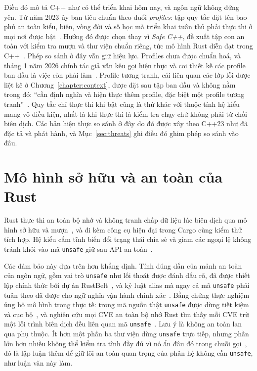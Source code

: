 Điều đó mô tả C++ như có thể triển khai hôm nay, và ngôn ngữ không đứng yên. Từ năm 2023 ủy
ban tiêu chuẩn theo đuổi \emph{profiles}: tập quy tắc đặt tên bao phủ an toàn kiểu, biên, vòng
đời và số học mà triển khai tuân thủ phải thực thi ở mọi nơi được
bật~\cite{sutter2025profiles}. Hướng đó được chọn thay vì \emph{Safe C++}, đề xuất tập con an
toàn với kiểm tra mượn và thư viện chuẩn riêng, tức mô hình Rust diễn đạt trong
C++~\cite{baxter2024safecpp}. Phép so sánh ở đây vẫn giữ hiệu lực. Profiles chưa được chuẩn
hoá, và tháng 1 năm 2026 chính tác giả vẫn kêu gọi hiện thực và coi thiết kế các profile ban
đầu là việc còn phải
làm~\cite{vandevoorde2026profiles}. Profile tương tranh, cái liên quan các lớp lỗi được liệt kê
ở Chương~\ref{chapter:context}, được đặt sau tập ban đầu và không nằm trong đó: ``cần định
nghĩa và hiện thực thêm profile, đặc biệt một profile
tương tranh''~\cite{vandevoorde2026profiles}. Quy tắc chỉ thực thi khi bật cũng là thứ khác
với thuộc tính hệ kiểu mang vô điều kiện, nhất là khi thực thi là kiểm tra chạy chứ không phải
từ chối biên dịch. Các bản hiện thực so sánh ở đây do đó được xây theo C++23 như đã đặc tả và
phát hành, và Mục~\ref{sec:threats} ghi điều đó ghim phép so sánh vào đâu.

\section{Mô hình sở hữu và an toàn của Rust}
Rust thực thi an toàn bộ nhớ và không tranh chấp dữ liệu lúc biên dịch qua mô hình sở hữu và
mượn~\cite{klabnik2023rust}, và đi kèm công cụ hiện đại trong Cargo cùng kiểm thử tích hợp. Hệ
kiểu cấm tĩnh biến đổi trạng thái chia sẻ và giam các ngoại lệ không tránh khỏi vào mã
\texttt{unsafe} giữ sau API an toàn~\cite{jung2021safe}.

Các đảm bảo này dựa trên hơn khẳng định. Tính đúng đắn của mảnh an toàn của ngôn ngữ, gồm vai
trò \texttt{unsafe} như lối thoát được đánh dấu rõ, đã được thiết lập chính thức bởi dự án
RustBelt~\cite{jung2018rustbelt}, và kỷ luật alias mà ngay cả mã \texttt{unsafe} phải tuân theo
đã được cho ngữ nghĩa vận hành
chính xác~\cite{jung2020stacked}. Bằng chứng thực nghiệm ủng hộ mô hình trong thực tế: trong
mã nguồn thật \texttt{unsafe} được dùng tiết kiệm và cục
bộ~\cite{qin2020rust,astrauskas2020unsafe}, và nghiên cứu mọi CVE an toàn bộ nhớ Rust tìm thấy
mỗi CVE trừ một lỗi trình biên dịch đều liên quan mã
\texttt{unsafe}~\cite{xu2021rustcve}. Lưu ý là không an toàn lan qua phụ thuộc. Ít hơn một phần
ba thư viện dùng \texttt{unsafe} trực tiếp, nhưng phần lớn hơn nhiều không thể kiểm tra tĩnh
đầy đủ vì nó ẩn đâu đó trong chuỗi
gọi~\cite{evans2020rust}, đó là lập luận thêm để giữ lõi an toàn quan trọng của phân hệ không
cần \texttt{unsafe}, như luận văn này làm.

